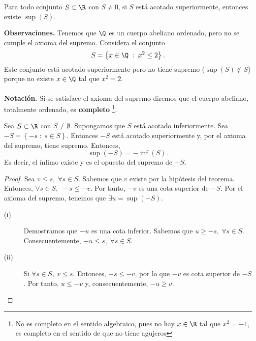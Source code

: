\begin{faxiom}
\normalfont Para todo conjunto $\displaystyle S \subset \R $ con $\displaystyle S \neq 0 $, si $\displaystyle S $ está acotado superiormente, entonces existe $\displaystyle \sup\left(S\right) $.
\end{faxiom}

\textbf{Observaciones.} Tenemos que $\displaystyle \Q $ es un cuerpo abeliano ordenado, pero no se cumple el axioma del supremo. Considera el conjunto 
\[S = \left\{ x \in \Q \; : \; x^{2} \leq 2\right\}  .\]
Este conjunto está acotado superiormente pero no tiene supremo ($\displaystyle \sup\left(S\right)\not\in S $) porque no existe $\displaystyle x \in \Q $ tal que $\displaystyle x^{2} = 2 $. \\ \\
\textbf{Notación.} Si se satisface el axioma del supremo diremos que el cuerpo abeliano, totalmente ordenado, es \textbf{completo} \footnote{No es completo en el sentido algebraico, pues no hay $\displaystyle x \in \R $ tal que $\displaystyle x^{2}=-1 $, es completo en el sentido de que no tiene agujeros}. 

\begin{ftheorem}[]
	\normalfont Sea $\displaystyle S \subset \R $  con $\displaystyle S \neq \emptyset $. Supongamos que $\displaystyle S $ está acotado inferiormente. Sea $\displaystyle - S = \left\{ - s \; : \; s \in S\right\}  $. Entonces $\displaystyle -S $ está acotado superiormente y, por el axioma del supremo, tiene supremo. Entonces, 
	\[\sup\left(-S\right) = - \inf\left(S\right) .\]
Es decir, el ínfimo existe y es el opuesto del supremo de $\displaystyle - S $.
\end{ftheorem}

\begin{proof}
Sea $\displaystyle v \leq s, \; \forall s \in S$. Sabemos que $\displaystyle v $ existe por la hipótesis del teorema. Entonces, $\displaystyle \forall s \in S, \; - s \leq - v $. Por tanto, $\displaystyle - v $ es una cota superior de $\displaystyle -S $. Por el axioma del supremo, tenemos que $\displaystyle \exists u = \sup\left(- S\right) $. 
\begin{description}
\item[(i)] Demostramos que $\displaystyle -u $ es una cota inferior. Sabemos que $\displaystyle u \geq - s, \; \forall s \in S $. Consecuentemente, $\displaystyle - u \leq s, \; \forall s \in S $. 
\item[(ii)] Si $\displaystyle \forall s \in S, \; v \leq s $. Entonces, $\displaystyle -s \leq - v $, por lo que $\displaystyle -v $ es cota superior de $\displaystyle -S $. Por tanto, $\displaystyle u \leq - v $ y, consecuentemente, $\displaystyle - u \geq v $.
\end{description}
\end{proof}

